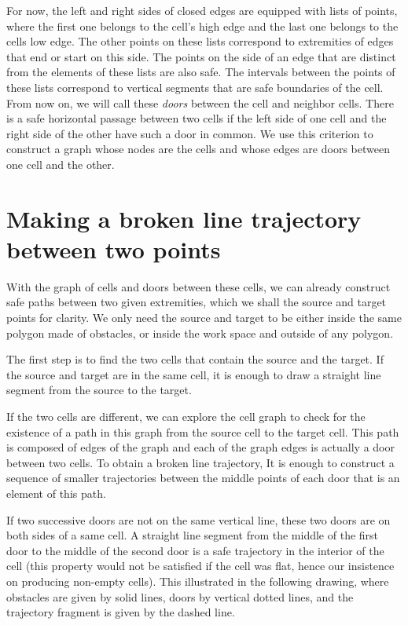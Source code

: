\documentclass{easychair}
\begin{document}
For now, the left and right sides of closed edges are equipped with
lists of points, where the first one belongs to the cell's high edge
and the last one belongs to the cells low edge.  The other points on
these lists correspond to extremities of edges that end or start on
this side.  The points on the side of an edge that are distinct from
the elements of these lists are also safe.  The intervals between the
points of these lists correspond to vertical segments that are safe
boundaries of the cell.  From now on, we will call these {\em doors}
between the cell and neighbor cells.  There is a safe horizontal
passage between two cells if the left side of one cell and the right
side of the other have such a door in common.  We use this criterion
to construct a graph whose nodes are the cells and whose edges are
doors between one cell and the other.

\section{Making a broken line trajectory between two points}
With the graph of cells and doors between these cells, we can already
construct safe paths between two given extremities, which we shall
the source and target points for clarity.  We only need the source and
target to be either inside the same polygon made of obstacles, or
inside the work space and outside of any polygon.

The first step is to find the two cells that contain the source and
the target.  If the source and target are in the same cell, it is
enough to draw a straight line segment from the source to the target.

If the two cells are different, we can explore the cell graph to check for
the existence of a path in this graph from the source cell to the
target cell.  This path is composed of edges of the graph and each of
the graph edges is actually a door between two cells.  To obtain a
broken line trajectory, It is enough to
construct a sequence of smaller trajectories between the middle points
of each door that is an element of this path.

If two successive doors are not on the same
vertical line, these two doors are on both sides of a same cell.  A
straight line segment from the middle of the first door to the middle of
the second door is a safe trajectory in the interior of the cell (this
property would not be satisfied if the cell was flat, hence our insistence
on producing non-empty cells).  This illustrated in the following drawing,
where obstacles are given by solid lines, doors by vertical dotted lines,
and the trajectory fragment is given by the dashed line.
\end{document}
